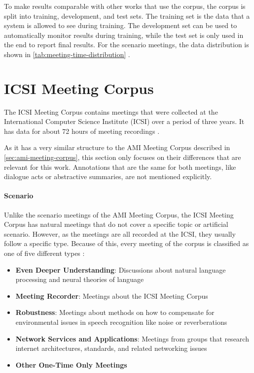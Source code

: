 To make results comparable with other works that use the corpus, the corpus is split into training, development, and test sets.
The training set is the data that a system is allowed to see during training.
The development set can be used to automatically monitor results during training, while the test set is only used in the end to report final results.
For the scenario meetings, the data distribution is shown in \cref{tab:meeting-time-distribution} \cite{amiWebsite}.


\section{ICSI Meeting Corpus}\label{sec:icsi-corpus}

The ICSI Meeting Corpus contains meetings that were collected at the International Computer Science Institute (ICSI) over a period of three years.
It has data for about 72 hours of meeting recordings \cite{Janin}.

As it has a very similar structure to the AMI Meeting Corpus described in \cref{sec:ami-meeting-corpus}, this section only focuses on their differences that are relevant for this work.
Annotations that are the same for both meetings, like dialogue acts or abstractive summaries, are not mentioned explicitly.

\paragraph{Scenario}

Unlike the scenario meetings of the AMI Meeting Corpus, the ICSI Meeting Corpus has natural meetings that do not cover a specific topic or artificial scenario.
However, as the meetings are all recorded at the ICSI, they usually follow a specific type.
Because of this, every meeting of the corpus is classified as one of five different types \cite{Janin}:
\begin{itemize}
\item \textbf{Even Deeper Understanding}: Discussions about natural language processing and neural theories of language
\item \textbf{Meeting Recorder}: Meetings about the ICSI Meeting Corpus
\item \textbf{Robustness}: Meetings about methods on how to compensate for environmental issues in speech recognition like noise or reverberations
\item \textbf{Network Services and Applications}: Meetings from groups that research internet architectures, standards, and related networking issues
\item \textbf{Other One-Time Only Meetings}
\end{itemize}

